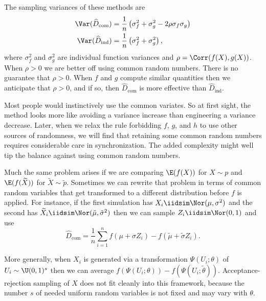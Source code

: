 The sampling variances of these methods are
\begin{equation}
	\begin{aligned}
		\Var(\widehat{D}_{\text{com}}) & = \frac{1}{n} \left(\sigma_f^2 + \sigma_g^2 - 2\rho\sigma_f\sigma_g\right) \\
		\Var(\widehat{D}_{\text{ind}}) & = \frac{1}{n} \left(\sigma_f^2 + \sigma_g^2\right),
	\end{aligned}
	\label{eq:8.21}
\end{equation}
where \(\sigma_f^2\) and \(\sigma_g^2\) are individual function variances and \(\rho = \Corr(f(X), g(X))\). When \(\rho > 0\) we are better off using common random numbers. There is no guarantee that \(\rho > 0\). When \(f\) and \(g\) compute similar quantities then we anticipate that \(\rho > 0\), and if so, then \(\widehat{D}_{\text{com}}\) is more effective than \(\widehat{D}_{\text{ind}}\).

Most people would instinctively use the common variates. So at first sight, the method looks more like avoiding a variance increase than engineering a variance decrease. Later, when we relax the rule forbidding \(f\), \(g\), and \(h\) to use other sources of randomness, we will find that retaining some common random numbers requires considerable care in synchronization. The added complexity might well tip the balance against using common random numbers.

Much the same problem arises if we are comparing \(\E(f(X))\) for \(X \sim p\) and \(\E(f(\widetilde{X}))\) for \(\widetilde{X} \sim \tilde{p}\). Sometimes we can rewrite that problem in terms of common random variables that get transformed to a different distribution before \(f\) is applied. For instance, if the first simulation has \(X_i \iidsim \Nor(\mu, \sigma^2)\) and the second has \(\widetilde{X}_i \iidsim \Nor(\tilde{\mu}, \tilde{\sigma}^2)\) then we can sample \(Z_i \iidsim \Nor(0, 1)\) and use
\begin{equation*}
	\widehat{D}_{\text{com}} = \frac{1}{n} \sum_{i=1}^n f(\mu + \sigma Z_i) - f(\tilde{\mu} + \tilde{\sigma} Z_i).
\end{equation*}

More generally, when \(X_i\) is generated via a transformation \(\Psi(U_i; \theta)\) of \(U_i \sim \U(0, 1)^s\) then we can average \(f(\Psi(U_i; \theta)) - f(\Psi(U_i; \widetilde{\theta}))\).
Acceptance-rejection sampling of \(X\) does not fit cleanly into this framework, because the number \(s\) of needed uniform random variables is not fixed and may vary with \(\theta\).

